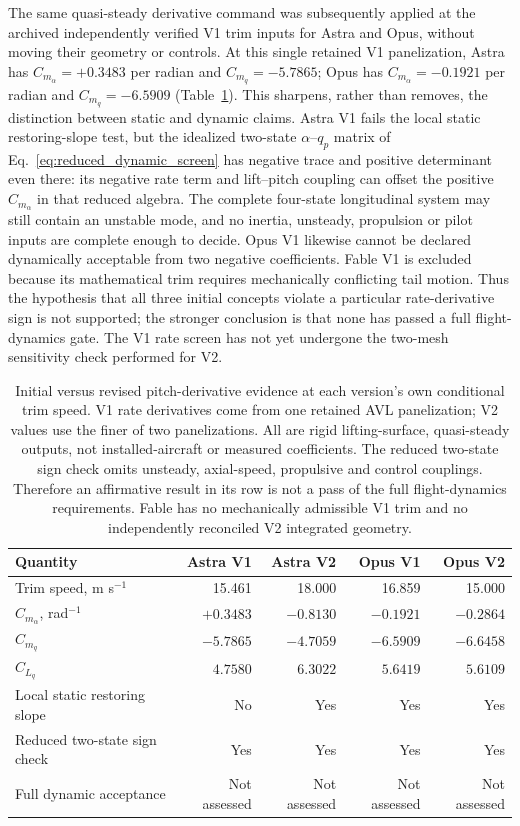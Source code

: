 \documentclass[10pt,letterpaper]{article}
\begin{document}
The same quasi-steady derivative command was subsequently applied at the archived independently verified V1 trim inputs for Astra and Opus, without moving their geometry or controls. At this single retained V1 panelization, Astra has $C_{m_\alpha}=+0.3483$ per radian and $C_{m_q}=-5.7865$; Opus has $C_{m_\alpha}=-0.1921$ per radian and $C_{m_q}=-6.5909$ (Table~\ref{tab:v1v2dynamic}). This sharpens, rather than removes, the distinction between static and dynamic claims. Astra V1 fails the local static restoring-slope test, but the idealized two-state $\alpha$--$q_p$ matrix of Eq.~\ref{eq:reduced_dynamic_screen} has negative trace and positive determinant even there: its negative rate term and lift--pitch coupling can offset the positive $C_{m_\alpha}$ in that reduced algebra. The complete four-state longitudinal system may still contain an unstable mode, and no inertia, unsteady, propulsion or pilot inputs are complete enough to decide. Opus V1 likewise cannot be declared dynamically acceptable from two negative coefficients. Fable V1 is excluded because its mathematical trim requires mechanically conflicting tail motion. Thus the hypothesis that all three initial concepts violate a particular rate-derivative sign is not supported; the stronger conclusion is that none has passed a full flight-dynamics gate. The V1 rate screen has not yet undergone the two-mesh sensitivity check performed for V2.

\begin{table}[H]\centering\footnotesize
\caption{Initial versus revised pitch-derivative evidence at each version's own conditional trim speed. V1 rate derivatives come from one retained AVL panelization; V2 values use the finer of two panelizations. All are rigid lifting-surface, quasi-steady outputs, not installed-aircraft or measured coefficients. The reduced two-state sign check omits unsteady, axial-speed, propulsive and control couplings. Therefore an affirmative result in its row is not a pass of the full flight-dynamics requirements. Fable has no mechanically admissible V1 trim and no independently reconciled V2 integrated geometry.}\label{tab:v1v2dynamic}
\begin{tabular}{lrrrr}\toprule
Quantity & Astra V1 & Astra V2 & Opus V1 & Opus V2\\\midrule
Trim speed, m s$^{-1}$ & 15.461 & 18.000 & 16.859 & 15.000\\
$C_{m_\alpha}$, rad$^{-1}$ & $+0.3483$ & $-0.8130$ & $-0.1921$ & $-0.2864$\\
$C_{m_q}$ & $-5.7865$ & $-4.7059$ & $-6.5909$ & $-6.6458$\\
$C_{L_q}$ & $4.7580$ & $6.3022$ & $5.6419$ & $5.6109$\\
Local static restoring slope & No & Yes & Yes & Yes\\
Reduced two-state sign check & Yes & Yes & Yes & Yes\\
Full dynamic acceptance & Not assessed & Not assessed & Not assessed & Not assessed\\\bottomrule
\end{tabular}
\end{table}
\end{document}
